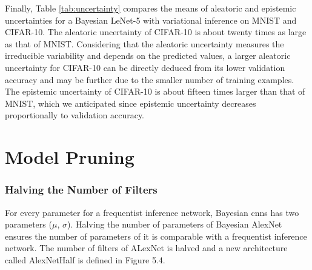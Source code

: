 \newline Finally, Table \ref{tab:uncertainty} compares the means of aleatoric and epistemic uncertainties for a Bayesian LeNet-5 with variational inference on MNIST and CIFAR-10. The aleatoric uncertainty of CIFAR-10 is about twenty times as large as that of MNIST. Considering that the aleatoric uncertainty measures the irreducible variability and depends on the predicted values, a larger aleatoric uncertainty for CIFAR-10 can be directly deduced from its lower validation accuracy and may be further due to the smaller number of training examples. The epistemic uncertainty of CIFAR-10 is about fifteen times larger than that of MNIST, which we anticipated since epistemic uncertainty decreases proportionally to validation accuracy. 
\begin{table}[H]
\tiny
    \centering
    \renewcommand{\arraystretch}{1.5}
    \renewcommand{\arraystretch}{1.5}
    \caption{Aleatoric and epistemic uncertainty for Bayesian LeNet-5 calculated for MNIST and CIFAR-10, computed as proposed by Kwon et al. \cite{kwon2018uncertainty}.}
    \label{tab:uncertainty}
\end{table}

\section{Model Pruning}

\subsubsection{Halving the Number of Filters}

For every parameter for a frequentist inference network, Bayesian \acp{cnn} has two parameters ($\mu$, $\sigma$). Halving the number of parameters of Bayesian AlexNet ensures the number of parameters of it is comparable with a frequentist inference network. The number of filters of ALexNet is halved and a new architecture called AlexNetHalf is defined in Figure 5.4. 

